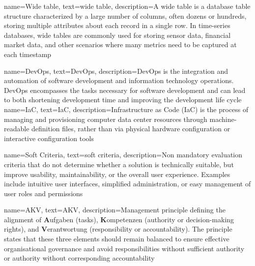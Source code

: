 {
    name={Wide table},
    text={wide table},
    description={A wide table is a database table structure characterized by a large number of columns, often dozens or hundreds, storing multiple attributes about each record in a single row. In time-series databases, wide tables are commonly used for storing sensor data, financial market data, and other scenarios where many metrics need to be captured at each timestamp}
}


{
    name={DevOps},
    text={DevOps},
    description={DevOps is the integration and automation of software development and information technology operations. DevOps encompasses the tasks necessary for software development and can lead to both shortening development time and improving the development life cycle}
}
{
    name={IaC},
    text={IaC},
    description={Infrastructure as Code (IaC) is the process of managing and provisioning computer data center resources through machine-readable definition files, rather than via physical hardware configuration or interactive configuration tools}
}

{
    name={Soft Criteria},
    text={soft criteria},
    description={Non mandatory evaluation criteria that do not determine whether a solution is technically suitable, but improve usability, maintainability, or the overall user experience. Examples include intuitive user interfaces, simplified administration, or easy management of user roles and permissions}
}

{
    name={AKV},
    text={AKV},
    description={Management principle defining the alignment of \textbf{A}ufgaben (tasks), \textbf{K}ompetenzen (authority or decision-making rights), and \textbf{V}erantwortung (responsibility or accountability). The principle states that these three elements should remain balanced to ensure effective organisational governance and avoid responsibilities without sufficient authority or authority without corresponding accountability}
}
